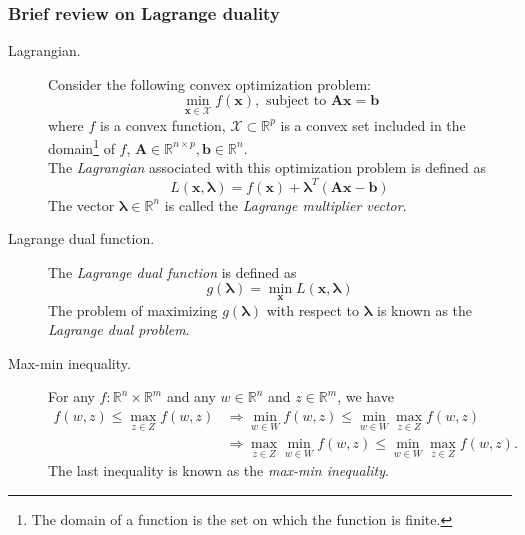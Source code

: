 \documentclass[12pt]{report}	%
\begin{document}
\subsubsection*{Brief review on Lagrange duality}
\begin{description}
\item[Lagrangian.] Consider the following convex optimization problem:  
\begin{equation}
\label{eq:convex-prob}
\min_{\mathbf{x}\in \mathcal{X}} f(\mathbf{x}), \text{ subject to }	\mathbf{Ax=b}
\end{equation}
where $f$ is a convex function, $\mathcal{X} \subset \mathbb{R}^p$ is a convex set included in the domain\footnote{The domain of a function is the set on which the function is finite.} of $f$,  $\mathbf{A}\in \mathbb{R}^{n\times p}, \mathbf{b}\in \mathbb{R}^{n}$.\\
The \textit{Lagrangian} associated with this optimization problem is defined as
\begin{equation}
\label{eq:lagrangian}
L(\mathbf{x},\bm{\lambda})= f(\mathbf{x}) + \bm{\lambda}^T(\mathbf{Ax-b})
\end{equation}
The vector $\bm{\lambda} \in \mathbb{R}^n$ is called the \textit{Lagrange multiplier vector}.\\

\item[Lagrange dual function.] The \textit{Lagrange dual function} is defined as 
\begin{equation}
\label{eq:dual-function}
g(\bm{\lambda}) = \min_{\mathbf{x}} L(\mathbf{x},\bm{\lambda})
\end{equation}
The problem of maximizing $g(\bm{\lambda})$ with respect to $\bm{\lambda}$ is known as the \textit{Lagrange dual problem}.\\ 

\item[Max-min inequality.]For any $f:\mathbb{R}^n\times \mathbb{R}^m$ and any $w\in \mathbb{R}^n$ and $z\in \mathbb{R}^m$, we have
\begin{align}
f(w,z) \le \max_{z\in Z} f(w,z) &\Longrightarrow \min_{w\in W} f(w,z) \le \min_{w\in W} \max_{z\in Z} f(w,z) \\
&\Longrightarrow \max_{z\in Z}\min_{w\in W} f(w,z) \le \min_{w\in W} \max_{z\in Z} f(w,z). \label{eq:max-min-ineq} 
\end{align}
The last inequality is known as the \textit{max-min inequality}.\\ 


\end{description}
\end{document}
